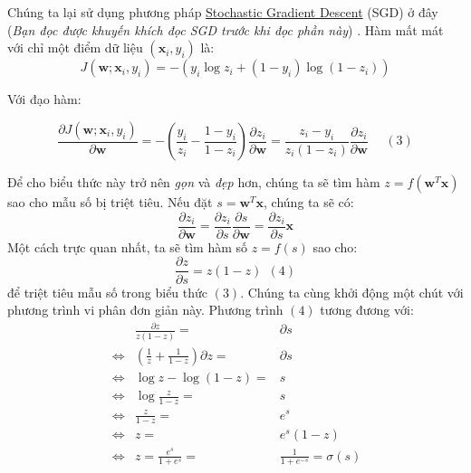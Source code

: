  
Chúng ta lại sử dụng phương pháp \href{http://machinelearningcoban.com/2017/01/16/gradientdescent2/#-stochastic-gradient-descent}{Stochastic Gradient Descent} (SGD) ở đây (\textit{Bạn đọc được khuyến khích đọc SGD trước khi đọc phần này}) . Hàm mất mát với chỉ một điểm dữ liệu $(\mathbf{x}_i, y_i)$ là: 
\begin{equation*} 
J(\mathbf{w}; \mathbf{x}_i, y_i) = -(y_i \log {z}_i + (1-y_i) \log (1 - {z}_i)) 
\end{equation*} 
 
Với đạo hàm: 

\begin{equation}
\frac{\partial J(\mathbf{w}; \mathbf{x}_i, y_i)}{\partial \mathbf{w}} = -(\frac{y_i}{z_i} - \frac{1- y_i}{1 - z_i} ) \frac{\partial z_i}{\partial \mathbf{w}}= \frac{z_i - y_i}{z_i(1 - z_i)} \frac{\partial z_i}{\partial \mathbf{w}} ~~~~~~ (3) 
\end{equation}
 
 
Để cho biểu thức này trở nên \textit{gọn} và \textit{đẹp} hơn, chúng ta sẽ tìm hàm $z = f(\mathbf{w}^T\mathbf{x})$ sao cho mẫu số bị triệt tiêu. Nếu đặt $s = \mathbf{w}^T\mathbf{x}$, chúng ta sẽ có: 
\begin{equation*} 
\frac{\partial z_i}{\partial \mathbf{w}} = \frac{\partial z_i}{\partial s} \frac{\partial s}{\partial \mathbf{w}} = \frac{\partial z_i}{\partial s} \mathbf{x} 
\end{equation*} 
Một cách trực quan nhất, ta sẽ tìm hàm số $z = f(s)$ sao cho: 
\begin{equation*} 
\frac{\partial z}{\partial s} = z(1 - z) ~~ (4) 
\end{equation*} 
để triệt tiêu mẫu số trong biểu thức $(3)$. Chúng ta cùng khởi động một chút với phương trình vi phân đơn giản này. Phương trình $(4)$ tương đương với: 
\begin{eqnarray*}
&\frac{\partial z}{z(1-z)} =& \partial s \\\ 
\Leftrightarrow & (\frac{1}{z} + \frac{1}{1 - z})\partial z =&\partial s \\\ 
\Leftrightarrow & \log z - \log(1 - z) =& s \\\ 
\Leftrightarrow & \log \frac{z}{1 - z} =& s \\\ 
\Leftrightarrow & \frac{z}{1 - z} =& e^s \\\ 
\Leftrightarrow & z =& e^s (1 - z) \\\ 
\Leftrightarrow & z = \frac{e^s}{1 +e^s} =&\frac{1}{1 + e^{-s}} = \sigma(s) 
\end{eqnarray*}

